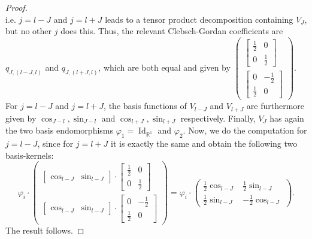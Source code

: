 \documentclass[12pt, a4paper]{article}
\theoremstyle{plain}
\theoremstyle{definition}
\theoremstyle{remark}
\newcommand{\R}{\mathds{R}}
\DeclareMathOperator{\Id}{Id}
\begin{document}
\begin{proof}
\begin{equation*}
\end{equation*}
i.e. $j = l-J$ and $j = l+J$ leads to a tensor product decomposition containing $V_J$, but no other $j$ does this. Thus, the relevant Clebsch-Gordan coefficients are $q_{J,(l-J,l)}$ and $q_{J,(l+J,l)}$, which are both equal and given by $\begin{pmatrix} \begin{bmatrix} \frac{1}{2} & 0 \\ 0 & \frac{1}{2} \end{bmatrix} \\ \begin{bmatrix} 0 & - \frac{1}{2} \\ \frac{1}{2} & 0\end{bmatrix}\end{pmatrix}$. For $j = l-J$ and $j = l+J$, the basis functions of $V_{l-J}$ and $V_{l+J}$ are furthermore given by $\cos_{J-l}, \sin_{J-l}$ and $\cos_{l+J}, \sin_{l+J}$ respectively. Finally, $V_J$ has again the two basis endomorphisms $\varphi_1 = \Id_{\R^1}$ and $\varphi_2$. Now, we do the computation for $j = l-J$, since for $j = l+J$ it is exactly the same and obtain the following two basis-kernels:
\begin{equation*}
\varphi_i \cdot \begin{pmatrix} \begin{bmatrix} \cos_{l-J} & \sin_{l-J} \end{bmatrix}\cdot \begin{bmatrix} \frac{1}{2} & 0 \\ 0 & \frac{1}{2}\end{bmatrix} \\
\begin{bmatrix} \cos_{l-J} & \sin_{l-J} \end{bmatrix}\cdot \begin{bmatrix} 0 & - \frac{1}{2} \\ \frac{1}{2} & 0\end{bmatrix} \end{pmatrix} = \varphi_i \cdot \begin{pmatrix} \frac{1}{2} \cos_{l-J} & \frac{1}{2} \sin_{l-J} \\ \frac{1}{2} \sin_{l-J} & - \frac{1}{2} \cos_{l-J}\end{pmatrix}.
\end{equation*} 
The result follows.
\end{proof}
\end{document}
